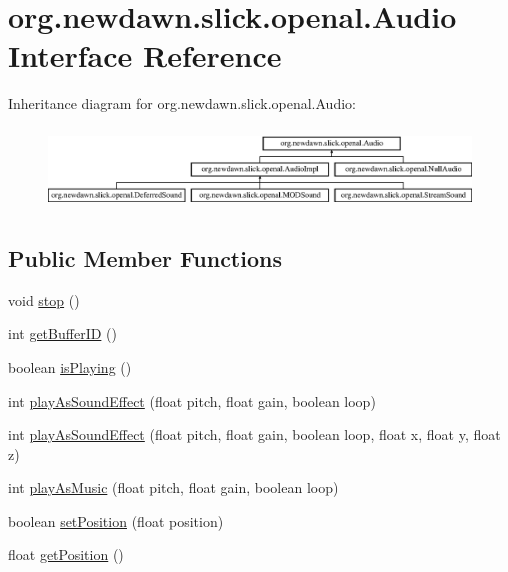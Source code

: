 \hypertarget{interfaceorg_1_1newdawn_1_1slick_1_1openal_1_1_audio}{}\section{org.\+newdawn.\+slick.\+openal.\+Audio Interface Reference}
\label{interfaceorg_1_1newdawn_1_1slick_1_1openal_1_1_audio}
Inheritance diagram for org.\+newdawn.\+slick.\+openal.\+Audio\+:\begin{figure}[H]
\begin{center}
\leavevmode
\includegraphics[height=2.170543cm]{interfaceorg_1_1newdawn_1_1slick_1_1openal_1_1_audio}
\end{center}
\end{figure}
\subsection*{Public Member Functions}
\begin{DoxyCompactItemize}
\item 
void \mbox{\hyperlink{interfaceorg_1_1newdawn_1_1slick_1_1openal_1_1_audio_a8346ca83b84cb6605efb695462f12337}{stop}} ()
\item 
int \mbox{\hyperlink{interfaceorg_1_1newdawn_1_1slick_1_1openal_1_1_audio_ac2a651989c7933bd896c7e0c382ba655}{get\+Buffer\+ID}} ()
\item 
boolean \mbox{\hyperlink{interfaceorg_1_1newdawn_1_1slick_1_1openal_1_1_audio_a842b49128a58be8c4473cbcc8ee4ad9e}{is\+Playing}} ()
\item 
int \mbox{\hyperlink{interfaceorg_1_1newdawn_1_1slick_1_1openal_1_1_audio_a69c3621a4a4bcbe9f1711f569c54017b}{play\+As\+Sound\+Effect}} (float pitch, float gain, boolean loop)
\item 
int \mbox{\hyperlink{interfaceorg_1_1newdawn_1_1slick_1_1openal_1_1_audio_aebd22c97a1ed92528ad816e7152c7e00}{play\+As\+Sound\+Effect}} (float pitch, float gain, boolean loop, float x, float y, float z)
\item 
int \mbox{\hyperlink{interfaceorg_1_1newdawn_1_1slick_1_1openal_1_1_audio_a9a13784b5ec9ce06c8756f98b00e05ab}{play\+As\+Music}} (float pitch, float gain, boolean loop)
\item 
boolean \mbox{\hyperlink{interfaceorg_1_1newdawn_1_1slick_1_1openal_1_1_audio_ace6e2e6fd29f40a8fe5daf8b28bc75e7}{set\+Position}} (float position)
\item 
float \mbox{\hyperlink{interfaceorg_1_1newdawn_1_1slick_1_1openal_1_1_audio_aa838b5606c0aa5f23dd46ac5918bb717}{get\+Position}} ()
\end{DoxyCompactItemize}


